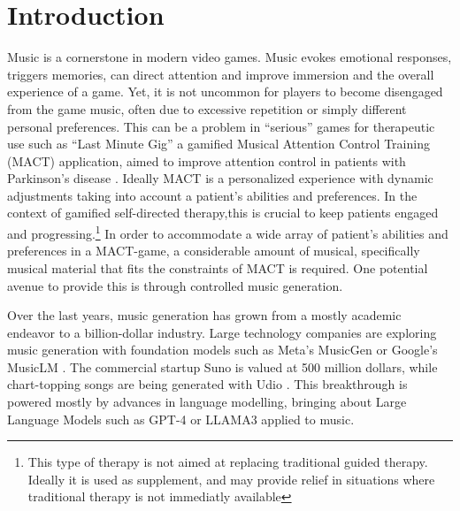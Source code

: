 

\chapter{Introduction}
\label{chap:intro}
\pagestyle{fancy}

Music is a cornerstone in modern video games. Music evokes emotional responses, triggers memories, can direct attention and improve immersion and the overall experience of a game. Yet, it is not uncommon for players to become disengaged from the game music, often due to excessive repetition or simply different personal preferences.\cite{Rogers_Weber_2019} This can be a problem in “serious” games for therapeutic use such as “Last Minute Gig” a gamified Musical Attention Control Training (MACT) application, aimed to improve attention control in patients with Parkinson’s disease \cite{Chalkiadakis_2022}. Ideally MACT is a personalized experience with dynamic adjustments taking into account a patient's abilities and preferences. In the context of gamified self-directed therapy,this is crucial to keep patients engaged and progressing.\footnote{This type of therapy is not aimed at replacing traditional guided therapy. Ideally it is used as supplement, and may provide relief in situations where traditional therapy is not immediatly available} In order to accommodate a wide array of patient's abilities and preferences in a MACT-game, a considerable amount of musical, specifically musical material that fits the constraints of MACT is required. One potential avenue to provide this is through controlled music generation.

Over the last years, music generation has grown from a mostly academic endeavor to a billion-dollar industry. Large technology companies are exploring music generation with foundation models such as Meta’s MusicGen\cite{copet2023simple} or Google’s MusicLM 
\cite{Agostinelli_Denk_Borsos_Engel_Verzetti_Caillon_Huang_Jansen_Roberts_Tagliasacchi_et_al._2023}. The commercial startup Suno is valued at 500 million dollars, while chart-topping songs are being generated with Udio \cite{Ferdinand_Meyen_2024}\cite{Stassen_2024}. This breakthrough is powered mostly by advances in language modelling, bringing about Large Language Models such as GPT-4 or LLAMA3 applied to music.

